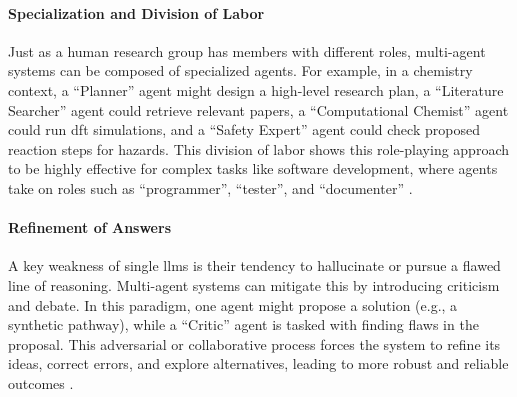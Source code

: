 \documentclass[11pt, oneside]{article}
\begin{document}
\paragraph{Specialization and Division of Labor} \label{sec:multi-agent}
Just as a human research group has members with different roles, multi-agent systems can be composed of specialized agents. For example, in a chemistry context, a \enquote{Planner} agent might design a high-level research plan, a \enquote{Literature Searcher} agent could retrieve relevant papers, a \enquote{Computational Chemist} agent could run \gls{dft} simulations, and a \enquote{Safety Expert} agent could check proposed reaction steps for hazards.\autocite{Zou2025ElAgente} This division of labor shows this role-playing approach to be highly effective for complex tasks like software development, where agents take on roles such as \enquote{programmer}, \enquote{tester}, and \enquote{documenter} \autocite{qian2024chatdevcommunicativeagentssoftware}.

\paragraph{Refinement of Answers} A key weakness of single \glspl{llm} is their tendency to hallucinate or pursue a flawed line of reasoning. Multi-agent systems can mitigate this by introducing criticism and debate. In this paradigm, one agent might propose a solution (e.g., a synthetic pathway), while a \enquote{Critic} agent is tasked with finding flaws in the proposal. This adversarial or collaborative process forces the system to refine its ideas, correct errors, and explore alternatives, leading to more robust and reliable outcomes \autocite{liang2024encouragingdivergentthinkinglarge, du2023improving}. 
\end{document}
